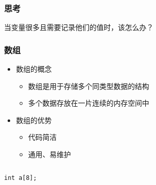\begin{frame}[fragile]
    \frametitle{思考}

    \begin{block}{}
        \vspace{.5cm}
        \begin{center}
            当变量很多且需要记录他们的值时，该怎么办？
        \end{center}
        \vspace{.5cm}
    \end{block}
\end{frame}

\begin{frame}[fragile]
    \frametitle{数组}

    \begin{overlayarea}{\textwidth}{.55\textheight}
        \begin{itemize}
            \item<1-> 数组的概念

                \begin{itemize}
                    \item 数组是用于存储多个同类型数据的结构
                    \item 多个数据存放在一片连续的内存空间中
                \end{itemize}

            \item<2-> 数组的优势

                \begin{itemize}
                    \item 代码简洁
                    \item 通用、易维护
                \end{itemize}
        \end{itemize}
    \end{overlayarea}

    \begin{columns}

        \lstinline|int a[8];|

    \end{columns}
\end{frame}

